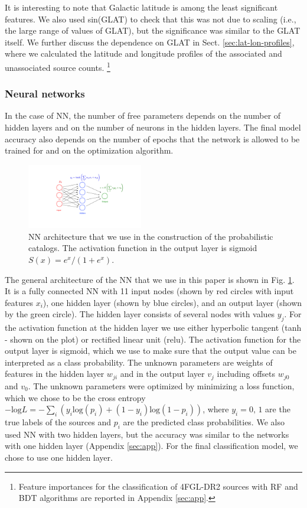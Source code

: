 \documentclass[referee]{aa} %
\begin{document}
It is interesting to note that Galactic latitude is among the least significant features.
We also used sin(GLAT) to check that this was not due to scaling (i.e., the large range of values of GLAT),
but the significance was similar to the GLAT itself.
We further discuss the dependence on GLAT in Sect. \ref{sec:lat-lon-profiles}, 
where we calculated the latitude and longitude profiles of the associated and unassociated source counts.%
\footnote{Feature importances for the classification of 4FGL-DR2 sources with RF and BDT algorithms are reported in Appendix \ref{sec:app}.}



\subsubsection{Neural networks}

In the case of NN, the number of free parameters depends on the number of hidden layers and on the number of neurons in the hidden layers. The final model accuracy also depends on the number of epochs that the network is allowed to be trained for and on the optimization algorithm. 

\begin{figure}[h]
\centering
\includegraphics[width=0.45\textwidth]{plots/CNN_network.pdf}
\caption{
NN architecture that we use in the construction of the probabilistic catalogs.
The activation function in the output layer is sigmoid $S(x) = {e^{x}}/{(1 + e^{x})}$.
}
\label{fig:NN_structure}
\end{figure}

The general architecture of the NN that we use in this paper is shown in Fig. \ref{fig:NN_structure}.
It is a fully connected NN with 11 input nodes (shown by red circles with input features $x_i$), one hidden layer (shown by blue circles),
and an output layer (shown by the green circle).
The hidden layer consists of several nodes with values $y_j$. 
For the activation function at the hidden layer we use either hyperbolic tangent (tanh - shown on the plot) or rectified linear unit (relu).
The activation function for the output layer is sigmoid, which we use to make sure that the output value can be interpreted as a class probability.
The unknown parameters are weights of features in the hidden layer $w_{ji}$ and in the output layer $v_j$ including
offsets $w_{j0}$ and $v_0$.
The unknown parameters were optimized by minimizing a loss function, which we chose to be
the cross entropy
$-\text{log}L = - \sum_i (y_i\text{log}(p_i)+(1-y_i)\text{log}(1 - p_i))$, 
where $y_i = 0,\,1$ are the true labels of the sources and $p_i$ are the predicted class probabilities.
We also used NN with two hidden layers, but the accuracy was similar to the networks with one hidden layer (Appendix \ref{sec:app}). For the final classification model, we chose to use one hidden layer.
\end{document}
